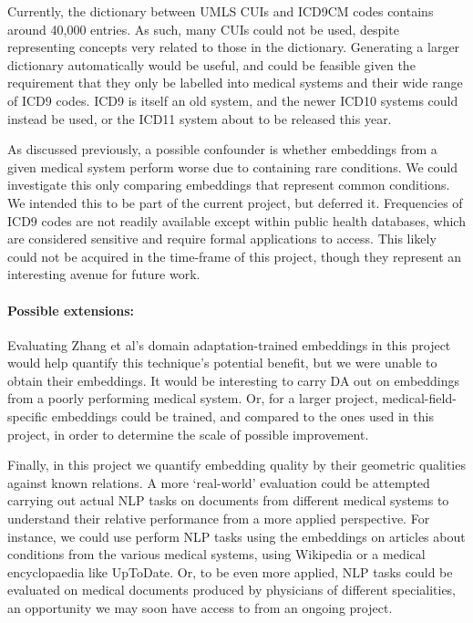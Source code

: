 \documentclass[10pt]{article}
\begin{document}
Currently, the dictionary between UMLS CUIs and ICD9CM codes contains around 40,000 entries. As such, many CUIs could not be used, despite representing concepts very related to those in the dictionary. Generating a larger dictionary automatically would be useful, and could be feasible given the requirement that they only be labelled into medical systems and their wide range of ICD9 codes. ICD9 is itself an old system, and the newer ICD10 systems could instead be used, or the ICD11 system about to be released this year.  

As discussed previously, a possible confounder is whether embeddings from a given medical system perform worse due to containing rare conditions. We could investigate this only comparing embeddings that represent common conditions. We intended this to be part of the current project, but deferred it. Frequencies of ICD9 codes are not readily available except within public health databases, which are considered sensitive and require formal applications to access. This likely could not be acquired in the time-frame of this project, though they represent an interesting avenue for future work. 
 
\paragraph{Possible extensions:}
Evaluating Zhang et al's domain adaptation-trained embeddings in this project would help quantify this technique's potential benefit, but we were unable to obtain their embeddings. It would be interesting to carry DA out on embeddings from a poorly performing medical system. Or, for a larger project, medical-field-specific embeddings could be trained, and compared to the ones used in this project, in order to determine the scale of possible improvement. 

Finally, in this project we quantify embedding quality by their geometric qualities against known relations. A more `real-world' evaluation could be attempted carrying out actual NLP tasks on documents from different medical systems to understand their relative performance from a more applied perspective. For instance, we could use perform NLP tasks using the embeddings on articles about conditions from the various medical systems, using Wikipedia or a medical encyclopaedia like UpToDate. Or, to be even more applied, NLP tasks could be evaluated on medical documents produced by physicians of different specialities, an opportunity we may soon have access to from an ongoing project. 
\end{document}
